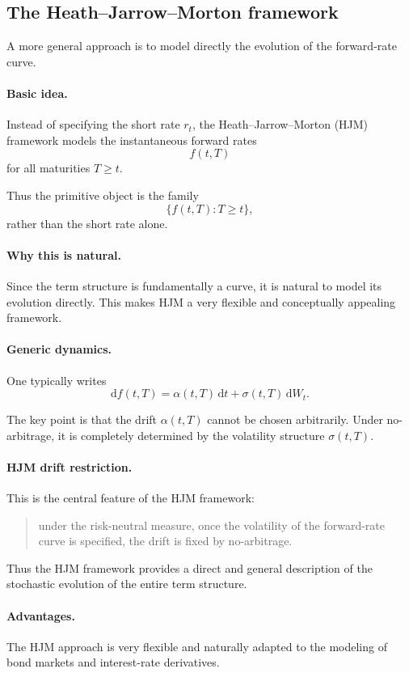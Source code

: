 \documentclass[11pt]{article}
\theoremstyle{plain}
\theoremstyle{definition}
\theoremstyle{remark}
\begin{document}
\subsection{The Heath--Jarrow--Morton framework}

A more general approach is to model directly the evolution of the
forward-rate curve.

\paragraph{Basic idea.}
Instead of specifying the short rate \(r_t\), the
Heath--Jarrow--Morton (HJM) framework models the instantaneous forward
rates
\[
f(t,T)
\]
for all maturities \(T\ge t\).

Thus the primitive object is the family
\[
\{f(t,T):T\ge t\},
\]
rather than the short rate alone.

\paragraph{Why this is natural.}
Since the term structure is fundamentally a curve, it is natural to
model its evolution directly.
This makes HJM a very flexible and conceptually appealing framework.

\paragraph{Generic dynamics.}
One typically writes
\[
\mathrm{d}f(t,T)=\alpha(t,T)\,\mathrm{d}t+\sigma(t,T)\,\mathrm{d}W_t.
\]

The key point is that the drift \(\alpha(t,T)\) cannot be chosen
arbitrarily.
Under no-arbitrage, it is completely determined by the volatility
structure \(\sigma(t,T)\).

\paragraph{HJM drift restriction.}
This is the central feature of the HJM framework:
\begin{quote}
under the risk-neutral measure, once the volatility of the forward-rate
curve is specified, the drift is fixed by no-arbitrage.
\end{quote}

Thus the HJM framework provides a direct and general description of the
stochastic evolution of the entire term structure.

\paragraph{Advantages.}
The HJM approach is very flexible and naturally adapted to the
modeling of bond markets and interest-rate derivatives.
\end{document}
